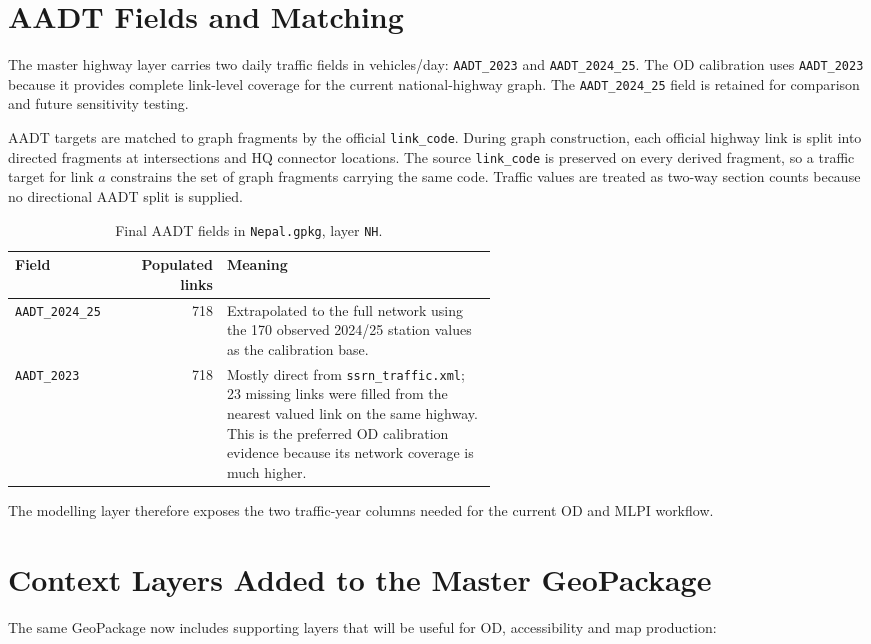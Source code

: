\documentclass[11pt,a4paper]{article}
\begin{document}
\section{AADT Fields and Matching}

The master highway layer carries two daily traffic fields in vehicles/day:
\texttt{AADT\_2023} and \texttt{AADT\_2024\_25}. The OD calibration uses
\texttt{AADT\_2023} because it provides complete link-level coverage for the
current national-highway graph. The \texttt{AADT\_2024\_25} field is retained
for comparison and future sensitivity testing.

AADT targets are matched to graph fragments by the official
\texttt{link\_code}. During graph construction, each official highway link is
split into directed fragments at intersections and HQ connector locations. The
source \texttt{link\_code} is preserved on every derived fragment, so a traffic
target for link $a$ constrains the set of graph fragments carrying the same
code. Traffic values are treated as two-way section counts because no
directional AADT split is supplied.

\begin{table}[H]
\centering
\caption{Final AADT fields in \texttt{Nepal.gpkg}, layer \texttt{NH}.}
\begin{tabular}{lrp{0.56\linewidth}}
\toprule
\textbf{Field} & \textbf{Populated links} & \textbf{Meaning} \\
\midrule
\texttt{AADT\_2024\_25} & 718 & Extrapolated to the full network using the
170 observed 2024/25 station values as the calibration base. \\
\texttt{AADT\_2023} & 718 & Mostly direct from \texttt{ssrn\_traffic.xml};
23 missing links were filled from the nearest valued link on the same highway.
This is the preferred OD calibration evidence
because its network coverage is much higher. \\
\bottomrule
\end{tabular}
\end{table}

The modelling layer therefore exposes the two traffic-year columns needed for
the current OD and MLPI workflow.

\section{Context Layers Added to the Master GeoPackage}

The same GeoPackage now includes supporting layers that will be useful for OD,
accessibility and map production:
\end{document}
